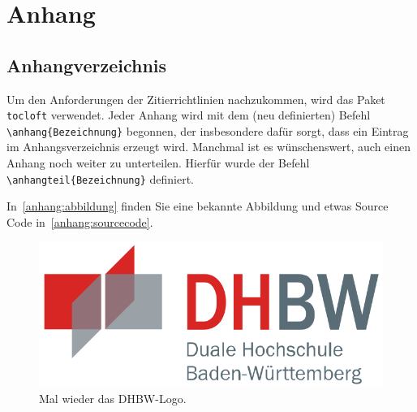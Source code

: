 \chapter*{Anhang}
\section*{Anhangverzeichnis}
\vspace{-8em}

\abstaendeanhangverzeichnis

\listofanhang
\clearpage
{} %




Um den Anforderungen der Zitierrichtlinien nachzukommen, wird das Paket \verb|tocloft| verwendet. Jeder Anhang wird mit dem (neu definierten) Befehl \lstinline|\anhang{Bezeichnung}| begonnen, der insbesondere dafür sorgt, dass ein Eintrag im Anhangsverzeichnis erzeugt wird. Manchmal ist es wünschenswert, auch einen Anhang noch weiter zu unterteilen. Hierfür wurde der Befehl \lstinline|\anhangteil{Bezeichnung}| definiert.

In~\ref{anhang:abbildung} finden Sie eine bekannte Abbildung und etwas Source Code in~\ref{anhang:sourcecode}.

\label{anhang:abbildung}
\begin{figure}[htb]
    \centering
    \includegraphics[width=0.9\linewidth]{lib/graphics/dhbw.png}
    \caption{Mal wieder das DHBW-Logo.}
\end{figure}

\label{anhang:sourcecode}


